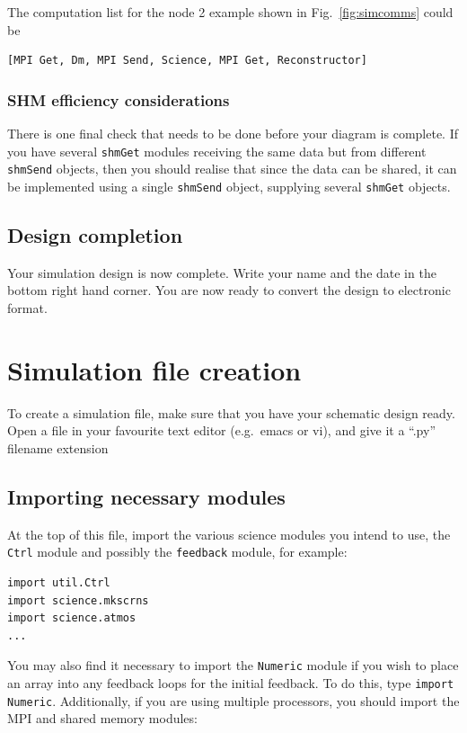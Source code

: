 \documentclass{article}
\newcommand{\mod}[1]{\texttt{#1}}
\begin{document}
The computation list for the node 2 example shown in Fig.~\ref{fig:simcomms}
could be
\begin{verbatim}
[MPI Get, Dm, MPI Send, Science, MPI Get, Reconstructor]
\end{verbatim}

\subsubsection{SHM efficiency considerations}
There is one final check that needs to be done before your diagram is
complete.  If you have several \mod{shmGet} modules receiving the same
data but from different \mod{shmSend} objects, then you should realise
that since the data can be shared, it can be implemented using a
single \mod{shmSend} object, supplying several \mod{shmGet} objects.

\subsection{Design completion}
Your simulation design is now complete.  Write your name and the date
in the bottom right hand corner.  You are now ready to convert the
design to electronic format.

\section{Simulation file creation}
\label{sect:simfilecreation}
To create a simulation file, make sure that you have your schematic
design ready.  Open a file in your favourite text editor (e.g.\ emacs
or vi), and give it a ``.py'' filename extension

\subsection{Importing necessary modules}
At the top of this file, import the various science modules you intend
to use, the \mod{Ctrl} module and possibly the \mod{feedback} module,
 for example: 

\begin{verbatim}
import util.Ctrl
import science.mkscrns 
import science.atmos
...
\end{verbatim}

You may also find it necessary to import the \mod{Numeric} module if
you wish to place an array into any feedback loops for the initial feedback.
To do this, type \texttt{import Numeric}.  Additionally, if you are
using multiple processors, you should import the MPI and shared memory
modules:
\end{document}
